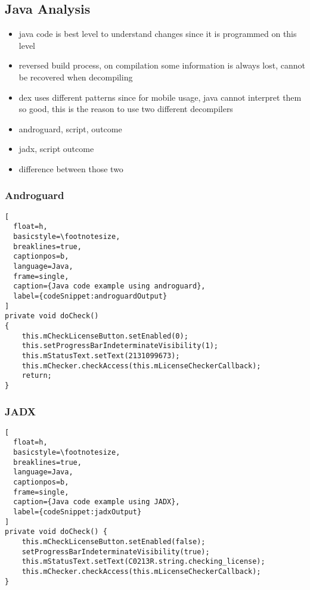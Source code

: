 \subsection{Java Analysis} \label{subsection:forensics-tools-java}
\begin{itemize}
    \item java code is best level to understand changes since it is programmed on this level
    \item reversed build process, on compilation some information is always lost, cannot be recovered when decompiling
    \item dex uses different patterns since for mobile usage, java cannot interpret them so good, this is the reason to use two different decompilers
    \item androguard, script, outcome
    \item jadx, script outcome
    \item difference between those two
\end{itemize}

\subsubsection{Androguard}


\begin{lstlisting}[
  float=h,
  basicstyle=\footnotesize,
  breaklines=true,
  captionpos=b,
  language=Java,
  frame=single,
  caption={Java code example using androguard},
  label={codeSnippet:androguardOutput}
]
private void doCheck()
{
    this.mCheckLicenseButton.setEnabled(0);
    this.setProgressBarIndeterminateVisibility(1);
    this.mStatusText.setText(2131099673);
    this.mChecker.checkAccess(this.mLicenseCheckerCallback);
    return;
}
\end{lstlisting}

\subsubsection{JADX}


\begin{lstlisting}[
  float=h,
  basicstyle=\footnotesize,
  breaklines=true,
  language=Java,
  captionpos=b,
  frame=single,
  caption={Java code example using JADX},
  label={codeSnippet:jadxOutput}
]
private void doCheck() {
    this.mCheckLicenseButton.setEnabled(false);
    setProgressBarIndeterminateVisibility(true);
    this.mStatusText.setText(C0213R.string.checking_license);
    this.mChecker.checkAccess(this.mLicenseCheckerCallback);
}
\end{lstlisting}
